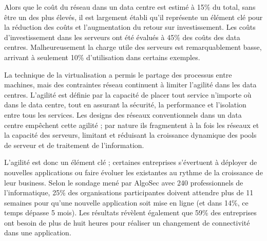 \par
Alors que le coût du réseau dans un data centre est estimé à 15\% du total, sans être un des plus élevés, il est largement établi qu'il représente un élément clé pour la réduction des coûts et l'augmentation du retour sur investissement. Les coûts d'investissement dans les serveurs ont été évalués à 45\% des coûts des data centres. Malheureusement la charge utile des serveurs est remarquablement basse, arrivant à seulement 10\% d'utilisation dans certains exemples.  \cite{cloudCosts}

\par 
La technique de la virtualisation a permis le partage des processus entre machines, mais des contraintes réseau continuent à limiter l'agilité dans les data centres. L'agilité est définie par la capacité de placer tout service n'importe où dans le data centre, tout en assurant la sécurité, la performance et l'isolation entre tous les services. Les designs des réseaux conventionnels dans un data centre empêchent cette agilité ; par nature ils fragmentent  à la fois les réseaux et la capacité des serveurs, limitant et réduisant la croissance dynamique des pools de serveur et de traitement de l'information. \cite{cloudCostsAgility}



\par 
L'agilité est donc un élément clé ; certaines entreprises s'évertuent à déployer de nouvelles applications ou faire évoluer les existantes au rythme de la croissance de leur business. Selon le sondage mené par AlgoSec avec 240 professionnels de l'informatique, 25\% des organisations participantes doivent attendre plus de 11 semaines pour qu'une nouvelle application soit mise en ligne (et dans 14\%, ce temps dépasse 5 mois). Les résultats révèlent également que 59\% des entreprises ont besoin de plus de huit heures pour réaliser un changement de connectivité dans une application. \cite{algoSecSurvey}


